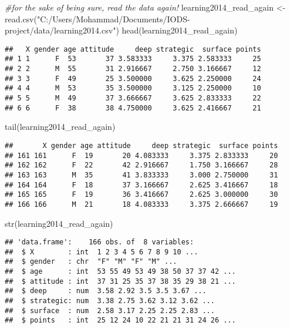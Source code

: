 \documentclass[
]{article}
\newenvironment{Shaded}{\begin{snugshade}}{\end{snugshade}}
\newcommand{\CommentTok}[1]{\textcolor[rgb]{0.56,0.35,0.01}{\textit{#1}}}
\newcommand{\FunctionTok}[1]{\textcolor[rgb]{0.00,0.00,0.00}{#1}}
\newcommand{\NormalTok}[1]{#1}
\newcommand{\OtherTok}[1]{\textcolor[rgb]{0.56,0.35,0.01}{#1}}
\newcommand{\StringTok}[1]{\textcolor[rgb]{0.31,0.60,0.02}{#1}}
\begin{document}
\begin{Shaded}
\begin{Highlighting}[]
\CommentTok{\#for the sake of being sure, read the data again!}
\NormalTok{learning2014\_read\_again }\OtherTok{\textless{}{-}} \FunctionTok{read.csv}\NormalTok{(}\StringTok{"C:/Users/Mohammad/Documents/IODS{-}project/data/learning2014.csv"}\NormalTok{)}
\FunctionTok{head}\NormalTok{(learning2014\_read\_again)}
\end{Highlighting}
\end{Shaded}

\begin{verbatim}
##   X gender age attitude     deep strategic  surface points
## 1 1      F  53       37 3.583333     3.375 2.583333     25
## 2 2      M  55       31 2.916667     2.750 3.166667     12
## 3 3      F  49       25 3.500000     3.625 2.250000     24
## 4 4      M  53       35 3.500000     3.125 2.250000     10
## 5 5      M  49       37 3.666667     3.625 2.833333     22
## 6 6      F  38       38 4.750000     3.625 2.416667     21
\end{verbatim}

\begin{Shaded}
\begin{Highlighting}[]
\FunctionTok{tail}\NormalTok{(learning2014\_read\_again)}
\end{Highlighting}
\end{Shaded}

\begin{verbatim}
##       X gender age attitude     deep strategic  surface points
## 161 161      F  19       20 4.083333     3.375 2.833333     20
## 162 162      F  22       42 2.916667     1.750 3.166667     28
## 163 163      M  35       41 3.833333     3.000 2.750000     31
## 164 164      F  18       37 3.166667     2.625 3.416667     18
## 165 165      F  19       36 3.416667     2.625 3.000000     30
## 166 166      M  21       18 4.083333     3.375 2.666667     19
\end{verbatim}

\begin{Shaded}
\begin{Highlighting}[]
\FunctionTok{str}\NormalTok{(learning2014\_read\_again)}
\end{Highlighting}
\end{Shaded}

\begin{verbatim}
## 'data.frame':    166 obs. of  8 variables:
##  $ X        : int  1 2 3 4 5 6 7 8 9 10 ...
##  $ gender   : chr  "F" "M" "F" "M" ...
##  $ age      : int  53 55 49 53 49 38 50 37 37 42 ...
##  $ attitude : int  37 31 25 35 37 38 35 29 38 21 ...
##  $ deep     : num  3.58 2.92 3.5 3.5 3.67 ...
##  $ strategic: num  3.38 2.75 3.62 3.12 3.62 ...
##  $ surface  : num  2.58 3.17 2.25 2.25 2.83 ...
##  $ points   : int  25 12 24 10 22 21 21 31 24 26 ...
\end{verbatim}
\end{document}
